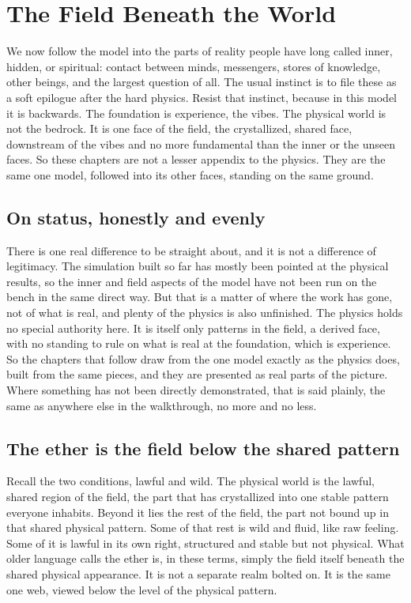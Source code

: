 \section{The Field Beneath the World}

We now follow the model into the parts of reality people have long called inner, hidden, or spiritual: contact between minds, messengers, stores of knowledge, other beings, and the largest question of all. The usual instinct is to file these as a soft epilogue after the hard physics. Resist that instinct, because in this model it is backwards. The foundation is experience, the vibes. The physical world is not the bedrock. It is one face of the field, the crystallized, shared face, downstream of the vibes and no more fundamental than the inner or the unseen faces. So these chapters are not a lesser appendix to the physics. They are the same one model, followed into its other faces, standing on the same ground.

\subsection{On status, honestly and evenly}

There is one real difference to be straight about, and it is not a difference of legitimacy. The simulation built so far has mostly been pointed at the physical results, so the inner and field aspects of the model have not been run on the bench in the same direct way. But that is a matter of where the work has gone, not of what is real, and plenty of the physics is also unfinished. The physics holds no special authority here. It is itself only patterns in the field, a derived face, with no standing to rule on what is real at the foundation, which is experience. So the chapters that follow draw from the one model exactly as the physics does, built from the same pieces, and they are presented as real parts of the picture. Where something has not been directly demonstrated, that is said plainly, the same as anywhere else in the walkthrough, no more and no less.

\subsection{The ether is the field below the shared pattern}

Recall the two conditions, lawful and wild. The physical world is the lawful, shared region of the field, the part that has crystallized into one stable pattern everyone inhabits. Beyond it lies the rest of the field, the part not bound up in that shared physical pattern. Some of that rest is wild and fluid, like raw feeling. Some of it is lawful in its own right, structured and stable but not physical. What older language calls the ether is, in these terms, simply the field itself beneath the shared physical appearance. It is not a separate realm bolted on. It is the same one web, viewed below the level of the physical pattern.

